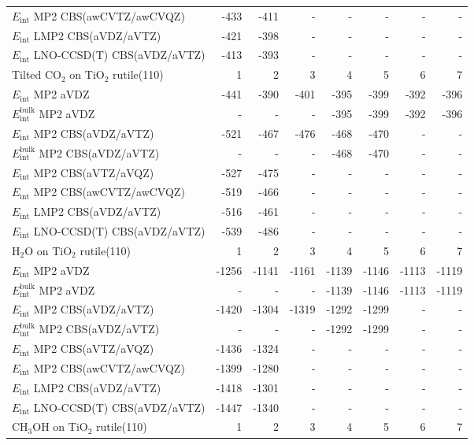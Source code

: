 \begin{longtable}{lrrrrrrr}
$E_\text{int}$ MP2 CBS(awCVTZ/awCVQZ) & -433 & -411 & - & - & - & - & - \\
$E_\text{int}$ LMP2 CBS(aVDZ/aVTZ) & -421 & -398 & - & - & - & - & - \\
$E_\text{int}$ LNO-CCSD(T) CBS(aVDZ/aVTZ) & -413 & -393 & - & - & - & - & - \\
\toprule
Tilted CO$_2$ on TiO$_2$ rutile(110) & 1 & 2 & 3 & 4 & 5 & 6 & 7 \\ 
\midrule
$E_\text{int}$ MP2 aVDZ & -441 & -390 & -401 & -395 & -399 & -392 & -396 \\
$E_\text{int}^\text{bulk}$ MP2 aVDZ & - & - & - & -395 & -399 & -392 & -396 \\
$E_\text{int}$ MP2 CBS(aVDZ/aVTZ) & -521 & -467 & -476 & -468 & -470 & - & - \\
$E_\text{int}^\text{bulk}$ MP2 CBS(aVDZ/aVTZ) & - & - & - & -468 & -470 & - & - \\
$E_\text{int}$ MP2 CBS(aVTZ/aVQZ) & -527 & -475 & - & - & - & - & - \\
$E_\text{int}$ MP2 CBS(awCVTZ/awCVQZ) & -519 & -466 & - & - & - & - & - \\
$E_\text{int}$ LMP2 CBS(aVDZ/aVTZ) & -516 & -461 & - & - & - & - & - \\
$E_\text{int}$ LNO-CCSD(T) CBS(aVDZ/aVTZ) & -539 & -486 & - & - & - & - & - \\
\toprule
H$_2$O on TiO$_2$ rutile(110) & 1 & 2 & 3 & 4 & 5 & 6 & 7 \\ 
\midrule
$E_\text{int}$ MP2 aVDZ & -1256 & -1141 & -1161 & -1139 & -1146 & -1113 & -1119 \\
$E_\text{int}^\text{bulk}$ MP2 aVDZ & - & - & - & -1139 & -1146 & -1113 & -1119 \\
$E_\text{int}$ MP2 CBS(aVDZ/aVTZ) & -1420 & -1304 & -1319 & -1292 & -1299 & - & - \\
$E_\text{int}^\text{bulk}$ MP2 CBS(aVDZ/aVTZ) & - & - & - & -1292 & -1299 & - & - \\
$E_\text{int}$ MP2 CBS(aVTZ/aVQZ) & -1436 & -1324 & - & - & - & - & - \\
$E_\text{int}$ MP2 CBS(awCVTZ/awCVQZ) & -1399 & -1280 & - & - & - & - & - \\
$E_\text{int}$ LMP2 CBS(aVDZ/aVTZ) & -1418 & -1301 & - & - & - & - & - \\
$E_\text{int}$ LNO-CCSD(T) CBS(aVDZ/aVTZ) & -1447 & -1340 & - & - & - & - & - \\
\toprule
CH$_3$OH on TiO$_2$ rutile(110) & 1 & 2 & 3 & 4 & 5 & 6 & 7 \\ 

\end{longtable}
